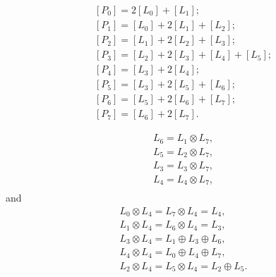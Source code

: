 \documentclass[10pt,a4paper]{amsart}
\begin{document}
\begin{equation}
\label{eq:proj_and_simple}
\begin{aligned}
    [P_0]=2[L_0]+[L_1];\\
    [P_1]=[L_0]+2[L_1]+[L_2];\\
    [P_2]=[L_1]+2[L_2]+[L_3];\\
    [P_3]=[L_2]+2[L_3]+[L_4]+[L_5];\\
    [P_4]=[L_3]+2[L_4];\\
    [P_5]=[L_3]+2[L_5]+[L_6];\\
    [P_6]=[L_5]+2[L_6]+[L_7];\\
    [P_7]=[L_6]+2[L_7].
\end{aligned}    
\end{equation}

    \begin{corollary} \label{cor:tens_simp_by_proj}
        \begin{align*}
            L_6 = L_1\otimes L_7,\\
            L_5 = L_2\otimes L_7,\\
            L_3 = L_3\otimes L_7,\\
            L_4 = L_4\otimes L_7,\\
        \end{align*}
        and
        \begin{align*}
            L_0\otimes L_4 = L_7\otimes L_4=L_4,\\
            L_1\otimes L_4 = L_6\otimes L_4 = L_3,\\
            L_3\otimes L_4 = L_1\oplus L_3\oplus L_6,\\
            L_4\otimes L_4 = L_0\oplus L_4\oplus L_7,\\
            L_2\otimes L_4 = L_5\otimes L_4 = L_2\oplus L_5.\\
        \end{align*}
    \end{corollary}
\end{document}
